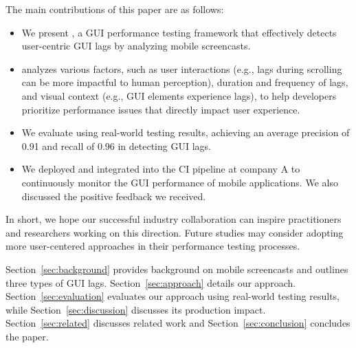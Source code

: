 The main contributions of this paper are as follows: 
\begin{itemize}
	\item We present \tool, a GUI performance testing framework that effectively detects user-centric GUI lags by analyzing mobile screencasts. %
 \item  \tool analyzes various factors, such as user interactions (e.g., lags during scrolling can be more impactful to human perception), duration and frequency of lags, and visual context (e.g., GUI elements experience lags), to help developers prioritize performance issues that directly impact user experience.

	\item We evaluate \tool using real-world testing results, achieving an average precision of 0.91 and recall of 0.96 in detecting GUI lags.


	\item We deployed and integrated \tool into the CI pipeline at company A to continuously monitor the GUI performance of mobile applications. We also discussed the positive feedback we received. 

\end{itemize}

In short, we hope our successful industry collaboration can inspire practitioners and researchers working on this direction. Future studies may consider adopting more user-centered approaches in their performance testing processes. 

Section~\ref{sec:background} provides background on mobile screencasts and outlines three types of GUI lags. Section~\ref{sec:approach} details our approach.
Section~\ref{sec:evaluation} evaluates our approach using real-world testing results, while Section~\ref{sec:discussion} discusses its production impact. Section~\ref{sec:related} discusses related work and Section~\ref{sec:conclusion} concludes the paper.
